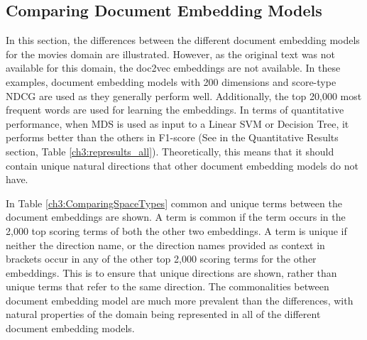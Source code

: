 \subsection{Comparing Document Embedding Models}\label{ch3:differentembeddingmodels}

In this section, the differences between the different document embedding models for the movies domain are illustrated.  However, as the original text was not available for this domain, the  doc2vec embeddings are not available. In these examples, document embedding models with  200 dimensions and score-type NDCG are used as they generally perform well. Additionally, the top 20,000 most frequent words are used  for learning the embeddings. In terms of quantitative performance,  when MDS is used as input to a Linear SVM or Decision Tree, it performs better than the others in F1-score (See in the Quantitative Results section, Table \ref{ch3:represults_all}). Theoretically, this means that it should contain unique natural directions that other document embedding models do not have. 

In Table \ref{ch3:ComparingSpaceTypes} common and unique terms between the document embeddings are shown. A term  is  common if the term occurs in the 2,000 top scoring terms of both the other two embeddings. A term is unique  if neither the direction name, or the direction names provided as context in brackets occur in any of the other top 2,000 scoring terms for the other embeddings. This is to ensure that unique directions are shown, rather than unique terms that refer to the same direction. The commonalities between document embedding model are much more prevalent than the differences, with natural properties of the domain being represented in all of the different document embedding models. 

